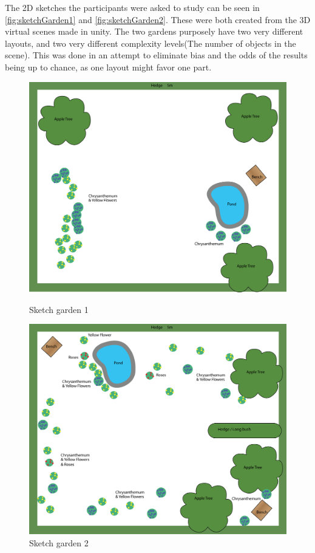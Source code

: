 The 2D sketches the participants were asked to study can be seen in \autoref{fig:sketchGarden1} and \autoref{fig:sketchGarden2}. These were both created from the 3D virtual scenes made in unity. The two gardens purposely have two very different layouts, and two very different complexity levels(The number of objects in the scene). This was done in an attempt to eliminate bias and the odds of the results being up to chance, as one layout might favor one part.
\begin{figure}[H]
	\centering
	\begin{minipage}[b]{0.49\textwidth}
	\includegraphics[width=1.0\linewidth]{figure/Evaluation/Garden1.png}
	\caption{Sketch garden 1}
	\label{fig:sketchGarden1}
	\end{minipage}
	\hfill
	\begin{minipage}[b]{0.49\textwidth}
	\includegraphics[width=1.0\linewidth]{figure/Evaluation/Garden2.png}
	\caption{Sketch garden 2}
	\label{fig:sketchGarden2}
	\end{minipage}
\end{figure}
